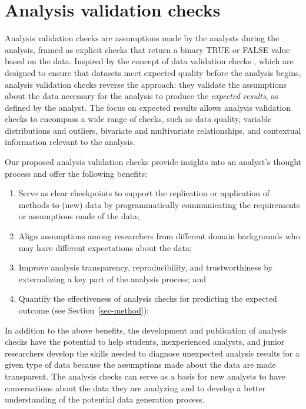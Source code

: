 \documentclass[
  12pt,
]{interact}
\providecommand{\tightlist}{%
  \setlength{\itemsep}{0pt}\setlength{\parskip}{0pt}}
\begin{document}
\section{Analysis validation checks}\label{sec-plan}

Analysis validation checks are assumptions made by the analysts during
the analysis, framed as explicit checks that return a binary TRUE or
FALSE value based on the data. Inspired by the concept of data
validation checks \citep{validate}, which are designed to ensure that
datasets meet expected quality before the analysis begins, analysis
validation checks reverse the approach: they validate the assumptions
about the data necessary for the analysis to produce the \emph{expected
results}, as defined by the analyst. The focus on expected results
allows analysis validation checks to encompass a wide range of checks,
such as data quality, variable distributions and outliers, bivariate and
multivariate relationships, and contextual information relevant to the
analysis.

Our proposed analysis validation checks provide insights into an
analyst's thought process and offer the following benefits:

\begin{enumerate}
\def\labelenumi{\arabic{enumi}.}
\tightlist
\item
  Serve as clear checkpoints to support the replication or application
  of methods to (new) data by programmatically communicating the
  requirements or assumptions made of the data;
\item
  Align assumptions among researchers from different domain backgrounds
  who may have different expectations about the data;
\item
  Improve analysis transparency, reproducibility, and trustworthiness by
  externalizing a key part of the analysis process; and
\item
  Quantify the effectiveness of analysis checks for predicting the
  expected outcome (see Section~\ref{sec-method});
\end{enumerate}

In addition to the above benefits, the development and publication of
analysis checks have the potential to help students, inexperienced
analysts, and junior researchers develop the skills needed to diagnose
unexpected analysis results for a given type of data because the
assumptions made about the data are made transparent. The analysis
checks can serve as a basis for new analysts to have conversations about
the data they are analyzing and to develop a better understanding of the
potential data generation process.
\end{document}
